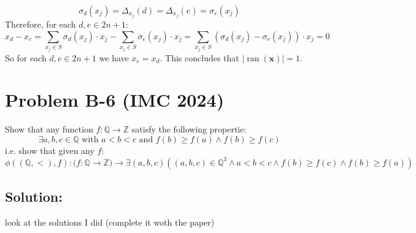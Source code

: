 \documentclass[11pt, a4paper, oneside]{article}
\newcommand{\problem}[1][]{\section{#1} \hfill \par}
\newcommand{\solution}[1][]{\subsection*{#1}\hfill \par}
\theoremstyle{remark}
\theoremstyle{lemma}
\begin{document}
\[
\sigma_d(x_j) = \Delta_{x_{j}}(d) = \Delta_{x_{j}}(e) = \sigma_e(x_j)
\]
Therefore, for each $d, e \in 2n + 1$:
\[
x_d - x_e = \sum_{x_j \in S} \sigma_{d}(x_j) \cdot x_j - \sum_{x_j \in S} \sigma_{e}(x_j) \cdot x_j = \sum_{x_j \in S} (\sigma_{d}(x_j) - \sigma_{e}(x_j)) \cdot x_j = 0
\]
So for each $d, e \in 2n + 1$ we have $x_e = x_d$. This concludes that $|\operatorname{ran}(\textbf{x})| = 1$.
\newpage
\problem[Problem B-6 (IMC 2024)]

Show that any function $f:\mathbb{Q}\longrightarrow\mathbb{Z}$ satisfy the following propertie:
$$\exists a,b,c\in\mathbb{Q}\text{ with } a<b<c \text{ and } f(b)\geq f(a)\wedge f(b)\geq f(c)$$
i.e. show that given any $f$:
$$\phi((\mathbb{Q},<),f):\Big(f:\mathbb{Q}\longrightarrow\mathbb{Z}\Big)\rightarrow\exists (a,b,c)\left((a,b,c)\in\mathbb{Q}^{3}\wedge a<b<c\wedge f(b)\geq f(c)\wedge f(b)\geq f(a)\right)$$
\solution[Solution:]
look at the solutions I did (complete it woth the paper)
\end{document}
